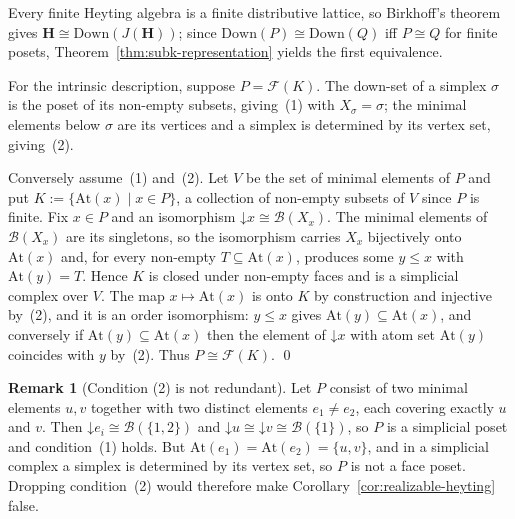 \documentclass[final,12pt]{elsarticle}
\theoremstyle{plain}
\theoremstyle{definition}
\newtheorem{rem}[thm]{Remark}
\begin{document}
\proof
Every finite Heyting algebra is a finite distributive lattice, so Birkhoff's
theorem gives \(\mathbf H \cong \mathrm{Down}(J(\mathbf H))\); since
\(\mathrm{Down}(P) \cong \mathrm{Down}(Q)\) iff \(P \cong Q\) for finite posets,
Theorem~\ref{thm:subk-representation} yields the first equivalence.

For the intrinsic description, suppose \(P = \mathcal F(K)\). The down-set of a
simplex \(\sigma\) is the poset of its non-empty subsets, giving~(1) with
\(X_\sigma = \sigma\); the minimal elements below \(\sigma\) are its vertices and
a simplex is determined by its vertex set, giving~(2).

Conversely assume~(1) and~(2). Let \(V\) be the set of minimal elements of \(P\)
and put \(K := \{\mathrm{At}(x) \mid x \in P\}\), a collection of non-empty
subsets of \(V\) since \(P\) is finite. Fix \(x \in P\) and an isomorphism
\(\mathord{\downarrow}x \cong \mathcal B(X_x)\). The minimal elements of
\(\mathcal B(X_x)\) are its singletons, so the isomorphism carries \(X_x\)
bijectively onto \(\mathrm{At}(x)\) and, for every non-empty
\(T \subseteq \mathrm{At}(x)\), produces some \(y \le x\) with
\(\mathrm{At}(y) = T\). Hence \(K\) is closed under non-empty faces and is a
simplicial complex over \(V\). The map \(x \mapsto \mathrm{At}(x)\) is onto \(K\)
by construction and injective by~(2), and it is an order isomorphism: \(y \le x\)
gives \(\mathrm{At}(y) \subseteq \mathrm{At}(x)\), and conversely if
\(\mathrm{At}(y) \subseteq \mathrm{At}(x)\) then the element of
\(\mathord{\downarrow}x\) with atom set \(\mathrm{At}(y)\) coincides with \(y\)
by~(2). Thus \(P \cong \mathcal F(K)\).
\qed

\begin{rem}[Condition (2) is not redundant]
\label{rem:condition-two-needed}
Let \(P\) consist of two minimal elements \(u,v\) together with two distinct
elements \(e_1 \neq e_2\), each covering exactly \(u\) and \(v\). Then
\(\mathord{\downarrow}e_i \cong \mathcal B(\{1,2\})\) and
\(\mathord{\downarrow}u \cong \mathord{\downarrow}v \cong \mathcal B(\{1\})\), so
\(P\) is a simplicial poset and condition~(1) holds. But
\(\mathrm{At}(e_1) = \mathrm{At}(e_2) = \{u,v\}\), and in a simplicial complex a
simplex is determined by its vertex set, so \(P\) is not a face poset. Dropping
condition~(2) would therefore make Corollary~\ref{cor:realizable-heyting} false.
\end{rem}
\end{document}
